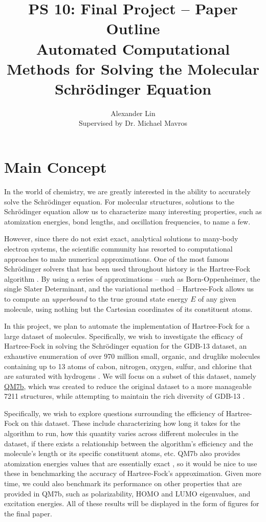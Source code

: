 \documentclass[12pt]{article}
\begin{document}
\title{PS 10: Final Project -- Paper Outline \\ Automated Computational Methods for Solving the Molecular Schr\"odinger Equation}
\author{Alexander Lin \\ Supervised by Dr. Michael Mavros}

\maketitle

\section{Main Concept} 
In the world of chemistry, we are greatly interested in the ability to accurately solve the Schr\"odinger equation.  For molecular structures, solutions to the Schr\"odinger equation allow us to characterize many interesting properties, such as atomization energies, bond lengths, and oscillation frequencies, to name a few.  

However, since there do not exist exact, analytical solutions to many-body electron systems, the scientific community has resorted to computational approaches to make numerical approximations.  One of the most famous Schr\"odinger solvers that has been used throughout history is the Hartree-Fock algorithm \cite{szabo2012}.  By using a series of approximations -- such as Born-Oppenheimer, the single Slater Determinant, and the variational method -- Hartree-Fock allows us to compute an \emph{upperbound} to the true ground state energy $E$ of any given molecule, using nothing but the Cartesian coordinates of its constituent atoms.  

In this project, we plan to automate the implementation of Hartree-Fock for a large dataset of molecules.  Specifically, we wish to investigate the efficacy of Hartree-Fock in solving the Schr\"odinger equation for the GDB-13 dataset, an exhaustive enumeration of over 970 million small, organic, and druglike molecules containing up to 13 atoms of cabon, nitrogen, oxygen, sulfur, and chlorine that are saturated with hydrogens \cite{blum2009}.  We will focus on a subset of this dataset, namely \href{http://quantum-machine.org/datasets/}{QM7b}, which was created to reduce the original dataset to a more manageable 7211 structures, while attempting to maintain the rich diversity of GDB-13 \cite{montavon2013}.  

Specifically, we wish to explore questions surrounding the efficiency of Hartree-Fock on this dataset.  These include characterizing how long it takes for the algorithm to run, how this quantity varies across different molecules in the dataset, if there exists a relationship between the algorithm's efficiency and the molecule's length or its specific constituent atoms, etc.  QM7b also provides atomization energies values that are essentially exact \cite{montavon2013}, so it would be nice to use these in benchmarking the accuracy of Hartree-Fock's approximation.  Given more time, we could also benchmark its performance on other properties that are provided in QM7b, such as polarizability, HOMO and LUMO eigenvalues, and excitation energies.  All of these results will be displayed in the form of figures for the final paper.  
\end{document}
